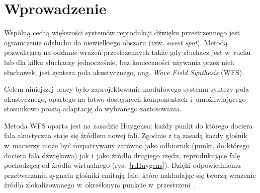 \documentclass[10pt, a4paper]{article}
\let\Oldsection\section
\renewcommand{\section}{\FloatBarrier\Oldsection}
\begin{document}
\section{Wprowadzenie}

Wspólną cechą większości systemów reprodukcji dźwięku przestrzennego jest 
ograniczenie odsłuchu do niewielkiego obszaru (tzw. \textit{sweet spot}).
Metodą pozwalającą na oddanie wrażeń przestrzennych także gdy słuchacz jest 
w~ruchu lub dla kilku słuchaczy jednocześnie, bez konieczności używania przez
nich słuchawek, jest synteza pola akustycznego, ang. \textit{Wave Field Synthesis}
(WFS).

Celem niniejszej pracy było zaprojektowanie modułowego systemu
syntezy pola akustycznego, opartego na łatwo dostępnych komponentach
i~umożliwiającego stosunkowo prostą adaptację do wybranego zastosowania.

Metoda WFS oparta jest na zasadzie Huygensa: każdy punkt do którego dociera
fala akustyczna staje się źródłem nowej fali. Zgodnie z tą zasadą każdy głośnik
w~macierzy może być rozpatrywany zarówno jako odbiornik (punkt, do którego
dociera fala dźwiękowa) jak i~jako źródło drugiego rzędu, reprodukujące falę
pochodzącą od źródła wirtualnego (rys.~\ref{r:Huygens}). Dzięki
odpowiedniemu przetwarzaniu sygnału głośniki emitują fale, które nakładając
się tworzą wrażenie źródła zlokalizowanego w~określonym punkcie w~przestrzeni~\cite{hq_rendering}.
\end{document}
